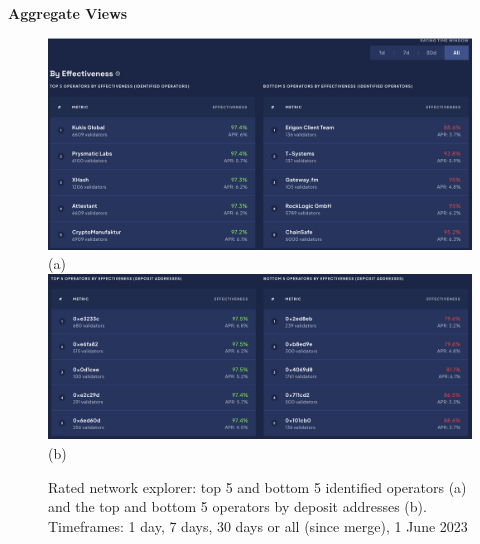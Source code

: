 \documentclass[UTF8]{article}
\begin{document}
\textbf{Aggregate Views} 
\begin{figure}[htbp]
\begin{center}
\includegraphics[width=\linewidth]{images/ratedtrend1}\\
(a)
\includegraphics[width=\linewidth]{images/ratedtrend2}\\
(b)
\caption{Rated network explorer: top 5 and bottom 5 identified operators (a) and the top and bottom 5 operators by deposit addresses (b). Timeframes: 1 day, 7 days, 30 days or all (since merge), 1 June 2023}
\label{fig:ratedtrend1}
\end{center}
\end{figure}
\end{document}

